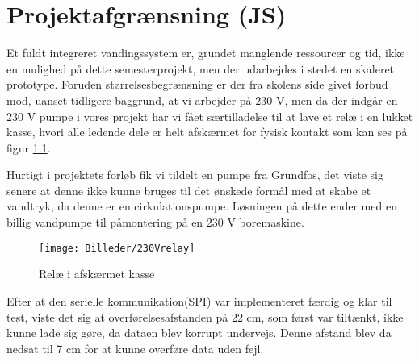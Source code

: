 \chapter{Projektafgrænsning (JS)}

Et fuldt integreret vandingssystem er, grundet manglende ressourcer og tid, ikke en mulighed på dette semesterprojekt, men der udarbejdes i stedet en skaleret prototype.
Foruden størrelsesbegrænsning er der fra skolens side givet forbud mod, uanset tidligere baggrund, at vi arbejder på 230 V, men da der indgår en 230 V pumpe i vores projekt har vi fået særtilladelse til at lave et relæ i en lukket kasse, hvori alle ledende dele er helt afskærmet for fysisk kontakt som kan ses på figur \ref{lab:230Vrelay}.

Hurtigt i projektets forløb fik vi tildelt en pumpe fra Grundfos, det viste sig senere at denne ikke kunne bruges til det ønskede formål med at skabe et vandtryk, da denne er en cirkulationspumpe. Løsningen på dette ender med en billig vandpumpe til påmontering på en 230 V boremaskine. 

\begin{figure}[H]
  \centering
    \texttt{[image: Billeder/230Vrelay]}
    \caption{Relæ i afskærmet kasse}
    \label{lab:230Vrelay}
\end{figure}

Efter at den serielle kommunikation(SPI) var implementeret færdig og klar til test, viste det sig at overførelsesafstanden på 22 cm, som først var tiltænkt, ikke kunne lade sig gøre, da dataen blev korrupt undervejs. Denne afstand blev da nedsat til 7 cm for at kunne overføre data uden fejl.
 

